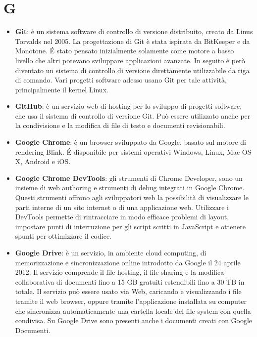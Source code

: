 \section{G}
\begin{itemize}
	\item
	\textbf{Git}: è un sistema software di controllo di versione distribuito, creato da Linus Torvalds nel 2005.
	La progettazione di Git è stata ispirata da BitKeeper e da Monotone. \'E stato pensato inizialmente solamente come motore a basso livello che altri potevano sviluppare applicazioni avanzate. In seguito è però diventato un sistema di controllo di versione direttamente utilizzabile da riga di comando. Vari progetti software adesso usano Git per tale attività, principalmente il kernel Linux.
	\item
	\textbf{GitHub}: è un servizio web di hosting per lo sviluppo di progetti software, che usa il sistema di controllo di versione Git. Può essere utilizzato anche per la condivisione e la modifica di file di testo e documenti revisionabili. 
	\item
	\textbf{Google Chrome}: è un browser sviluppato da Google, basato sul motore di rendering Blink. \'E disponibile per sistemi operativi Windows, Linux, Mac OS X, Android e iOS. 
	\item
	\textbf{Google Chrome DevTools}: gli strumenti di Chrome Developer, sono un insieme di web authoring e strumenti di debug integrati in Google Chrome. Questi strumenti offrono agli sviluppatori web la possibilità di visualizzare le parti interne di un sito internet o di una applicazione web. Utilizzare i DevTools permette di rintracciare in modo efficace problemi di layout, impostare punti di interruzione per gli script scritti in JavaScript e ottenere spunti per ottimizzare il codice.
	\item
	\textbf{Google Drive}: è un servizio, in ambiente cloud computing, di memorizzazione e sincronizzazione online introdotto da Google il 24 aprile 2012. Il servizio comprende il file hosting, il file sharing e la modifica collaborativa di documenti fino a 15 GB gratuiti estendibili fino a 30 TB in totale. Il servizio può essere usato via Web, caricando e visualizzando i file tramite il web browser, oppure tramite l'applicazione installata su computer che sincronizza automaticamente una cartella locale del file system con quella condivisa. Su Google Drive sono presenti anche i documenti creati con Google Documenti.
\end{itemize}
